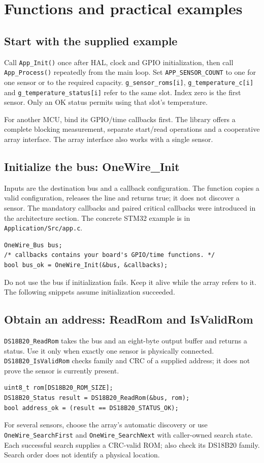 \section{Functions and practical examples}
\subsection{Start with the supplied example}
Call \texttt{App\_Init()} once after HAL, clock and GPIO initialization, then call
\texttt{App\_Process()} repeatedly from the main loop. Set
\texttt{APP\_SENSOR\_COUNT} to one for one sensor or to the required capacity.
\texttt{g\_sensor\_roms[i]}, \texttt{g\_temperature\_c[i]} and
\texttt{g\_temperature\_status[i]} refer to the same slot. Index zero is the first
sensor. Only an OK status permits using that slot's temperature.

For another MCU, bind its GPIO/time callbacks first. The library offers a
complete blocking measurement, separate start/read operations and a cooperative
array interface. The array interface also works with a single sensor.

\subsection{Initialize the bus: OneWire\_Init}
Inputs are the destination bus and a callback configuration. The function
copies a valid configuration, releases the line and returns true; it does not
discover a sensor. The mandatory callbacks and paired critical callbacks were
introduced in the architecture section. The concrete STM32 example is in
\texttt{Application/Src/app.c}.
\begin{lstlisting}
OneWire_Bus bus;
/* callbacks contains your board's GPIO/time functions. */
bool bus_ok = OneWire_Init(&bus, &callbacks);
\end{lstlisting}
Do not use the bus if initialization fails. Keep it alive while the array
refers to it. The following snippets assume initialization succeeded.

\subsection{Obtain an address: ReadRom and IsValidRom}
\texttt{DS18B20\_ReadRom} takes the bus and an eight-byte output buffer and
returns a status. Use it only when exactly one sensor is physically connected.
\texttt{DS18B20\_IsValidRom} checks family and CRC of a supplied address;
it does not prove the sensor is currently present.
\begin{lstlisting}
uint8_t rom[DS18B20_ROM_SIZE];
DS18B20_Status result = DS18B20_ReadRom(&bus, rom);
bool address_ok = (result == DS18B20_STATUS_OK);
\end{lstlisting}
For several sensors, choose the array's automatic discovery or use
\texttt{OneWire\_SearchFirst} and \texttt{OneWire\_SearchNext} with caller-owned
search state. Each successful search supplies a CRC-valid ROM; also check its
DS18B20 family. Search order does not identify a physical location.

